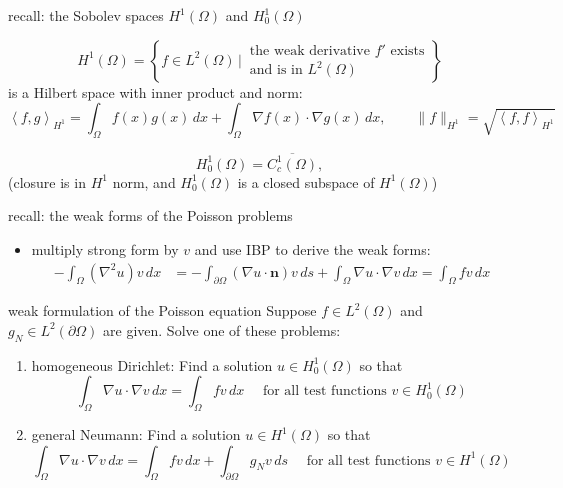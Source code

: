 \documentclass[10pt,
               svgnames,
               hyperref={colorlinks,
                         citecolor=DeepPink4,
                         linkcolor=FireBrick,
                         urlcolor=blue},
               usepdftitle=false]{beamer}
\newcommand{\bn}{\mathbf{n}}
\newcommand{\grad}{\nabla}
\newcommand{\ip}[2]{\left<#1,#2\right>}
\begin{document}
\begin{frame}{recall: the Sobolev spaces $H^1(\Omega)$ and $H_0^1(\Omega)$}

\small

\begin{definition}
    $$H^1(\Omega) = \left\{f\in L^2(\Omega) \,\Big|\, \begin{matrix} \text{the weak derivative } f' \text{ exists} \\ \text{and is in } L^2(\Omega)\end{matrix}\right\}$$
is a Hilbert space with inner product and norm:
	$$\ip{f}{g}_{H^1} = \int_\Omega f(x) g(x)\,dx + \int_\Omega \grad f(x)\cdot \grad g(x)\,dx, \qquad \|f\|_{H^1} = \sqrt{\ip{f}{f}_{H^1}}$$
\end{definition}

\begin{definition}
    $$H_0^1(\Omega) = \overline{C_c^1(\Omega)},$$
(closure is in $H^1$ norm, and $H_0^1(\Omega)$ is a closed subspace of $H^1(\Omega)$)
\end{definition}
\end{frame}


\begin{frame}{recall: the weak forms of the Poisson problems}

\begin{itemize}
\item multiply strong form by $v$ and use IBP to derive the weak forms:
\begin{align*}
-\int_\Omega (\grad^2 u) v\,dx &= -\int_{\partial \Omega} (\grad u\cdot \bn) v\,ds +\int_\Omega \grad u \cdot \grad v\,dx = \int_\Omega f v\,dx
\end{align*}
\end{itemize}

\begin{block}{weak formulation of the Poisson equation}
Suppose $f\in L^2(\Omega)$ and $g_N\in L^2(\partial\Omega)$ are given.  Solve one of these problems:
\begin{enumerate}
\item \alert{homogeneous Dirichlet:}  Find a solution $u\in H_0^1(\Omega)$ so that
    $$\int_\Omega \grad u \cdot \grad v\,dx = \int_\Omega f v\,dx \quad \text{ for all test functions } v\in H_0^1(\Omega)$$
\item \alert{general Neumann:}  Find a solution $u\in H^1(\Omega)$ so that
    $$\int_\Omega \grad u \cdot \grad v\,dx = \int_\Omega f v\,dx + \int_{\partial\Omega} g_N v\,ds  \quad \text{ for all test functions } v\in H^1(\Omega)$$
\end{enumerate}
\end{block}
\end{frame}
\end{document}
